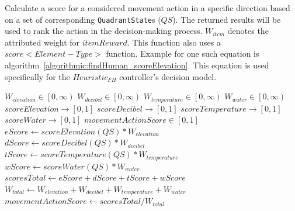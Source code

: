 \begin{algorithm}[H]
  \caption[Heuristic - Score Potential Movement Action (Find Human)]{Calculate a score for a considered movement action in a specific direction based on a set of corresponding \texttt{QuadrantState}s ($QS$). The returned results will be used to rank the action in the decision-making process. $W_{item}$ denotes the attributed weight for $itemReward$. This function also uses a $score<Element-Type>$ function. Example for one such equation is algorithm~\ref{algorithmic:findHuman_scoreElevation}. This equation is used specifically for the $Heuristic_{FH}$ controller's decision model.}
  \begin{algorithmic} \label{algorithmic:findHuman_scoreMovmentAction}
    \REQUIRE $W_{elevation} \in \left[0, \infty \right)$
    \REQUIRE $W_{decibel} \in \left[0, \infty \right)$
    \REQUIRE $W_{temperature} \in \left[0, \infty \right)$
    \REQUIRE $W_{water} \in \left[0, \infty \right)$
    \ENSURE $scoreElevation \rightarrow \left[0, 1 \right]$
    \ENSURE $scoreDecibel \rightarrow \left[0, 1 \right]$
    \ENSURE $scoreTemperature \rightarrow \left[0, 1 \right]$
    \ENSURE $scoreWater \rightarrow \left[0, 1 \right]$
    \ENSURE $movementActionScore \in \left[0, 1 \right]$
    \STATE $eScore \leftarrow scoreElevation(QS) * W_{elevation}$
    \STATE $dScore \leftarrow scoreDecibel(QS) * W_{decibel}$
    \STATE $tScore \leftarrow scoreTemperature(QS) * W_{temperature}$
    \STATE $wScore \leftarrow scoreWater(QS) * W_{water}$
    \STATE $scoresTotal \leftarrow eScore + dScore + tScore + wScore$
    \STATE $W_{total} \leftarrow W_{elevation} + W_{decibel} + W_{temperature} + W_{water}$
    \RETURN $movementActionScore \leftarrow scoresTotal / W_{total}$
  \end{algorithmic}
\end{algorithm}


